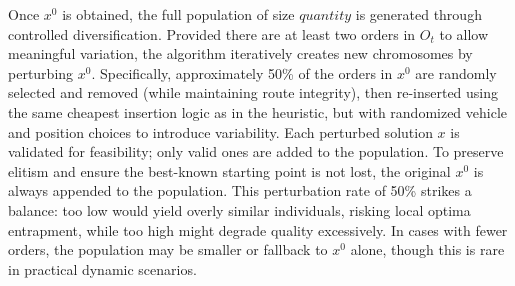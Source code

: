 \documentclass[pdflatex]{sn-jnl}
\begin{document}




Once $x^0$ is obtained, the full population of size $quantity$ is generated through controlled diversification. Provided there are at least two orders in $O_t$ to allow meaningful variation, the algorithm iteratively creates new chromosomes by perturbing $x^0$. Specifically, approximately 50\% of the orders in $x^0$ are randomly selected and removed (while maintaining route integrity), then re-inserted using the same cheapest insertion logic as in the heuristic, but with randomized vehicle and position choices to introduce variability. Each perturbed solution $x$ is validated for feasibility; only valid ones are added to the population. To preserve elitism and ensure the best-known starting point is not lost, the original $x^0$ is always appended to the population. This perturbation rate of 50\% strikes a balance: too low would yield overly similar individuals, risking local optima entrapment, while too high might degrade quality excessively. In cases with fewer orders, the population may be smaller or fallback to $x^0$ alone, though this is rare in practical dynamic scenarios.

\end{document}
